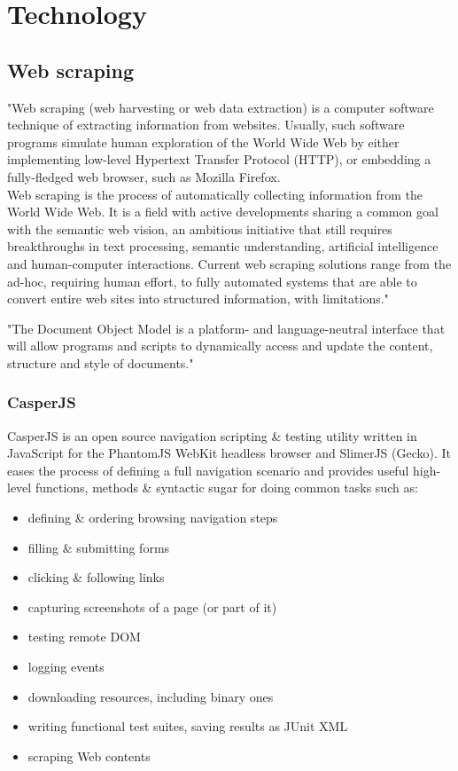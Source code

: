 \chapter{Technology}

\section{Web scraping}
	"Web scraping (web harvesting or web data extraction) is a computer software technique of extracting information from websites. Usually, such software programs simulate human exploration of the World Wide Web by either implementing low-level Hypertext Transfer Protocol (HTTP), or embedding a fully-fledged web browser, such as Mozilla Firefox.\\

Web scraping is the process of automatically collecting information from the World Wide Web. It is a field with active developments sharing a common goal with the semantic web vision, an ambitious initiative that still requires breakthroughs in text processing, semantic understanding, artificial intelligence and human-computer interactions. Current web scraping solutions range from the ad-hoc, requiring human effort, to fully automated systems that are able to convert entire web sites into structured information, with limitations." \cite{wikiScraping}

"The Document Object Model is a platform- and language-neutral interface that will allow programs and scripts to dynamically access and update the content, structure and style of documents." \cite{w3cDOM}
\subsection{CasperJS}
		\cite{casperjs}
		CasperJS is an open source navigation scripting \& testing utility written in JavaScript for the PhantomJS WebKit headless browser and SlimerJS (Gecko). It eases the process of defining a full navigation scenario and provides useful high-level functions, methods \& syntactic sugar for doing common tasks such as:
\begin{itemize}
	\item defining \& ordering browsing navigation steps
	\item filling \& submitting forms
	\item clicking \& following links
	\item capturing screenshots of a page (or part of it)
	\item testing remote DOM
	\item logging events
	\item downloading resources, including binary ones
	\item writing functional test suites, saving results as JUnit XML
	\item scraping Web contents
\end{itemize}

